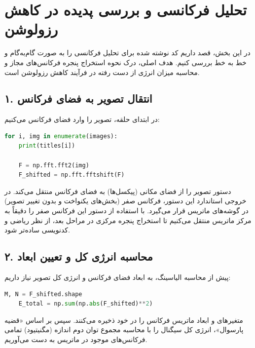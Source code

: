 \section{تحلیل فرکانسی و بررسی پدیده  در کاهش رزولوشن}

در این بخش، قصد داریم کد نوشته شده برای تحلیل فرکانسی را به صورت گام‌به‌گام و خط به خط بررسی کنیم. هدف اصلی، درک نحوه استخراج پنجره فرکانس‌های مجاز و محاسبه میزان انرژی از دست رفته در فرآیند کاهش رزولوشن است.

\subsection*{۱. انتقال تصویر به فضای فرکانس}
در ابتدای حلقه، تصویر را وارد فضای فرکانس می‌کنیم:

\begin{codebox}
\begin{lstlisting}[language=Python]
for i, img in enumerate(images):
    print(titles[i])
    
    F = np.fft.fft2(img)
    F_shifted = np.fft.fftshift(F)
\end{lstlisting}
\end{codebox}

دستور  تصویر را از فضای مکانی (پیکسل‌ها) به فضای فرکانس منتقل می‌کند. در خروجی استاندارد این دستور، فرکانس صفر (بخش‌های یکنواخت و بدون تغییر تصویر) در گوشه‌های ماتریس قرار می‌گیرد. با استفاده از دستور  این فرکانس صفر را دقیقاً به مرکز ماتریس منتقل می‌کنیم تا استخراج پنجره مرکزی در مراحل بعد، از نظر ریاضی و کدنویسی ساده‌تر شود.

\subsection*{۲. محاسبه انرژی کل و تعیین ابعاد}
پیش از محاسبه الیاسینگ، به ابعاد فضای فرکانس و انرژی کل تصویر نیاز داریم:

\begin{codebox}
\begin{lstlisting}[language=Python]
    M, N = F_shifted.shape
    E_total = np.sum(np.abs(F_shifted)**2)
\end{lstlisting}
\end{codebox}

متغیرهای  و  ابعاد ماتریس فرکانس را در خود ذخیره می‌کنند. سپس بر اساس «قضیه پارسوال»، انرژی کل سیگنال را با محاسبه مجموع توان دوم اندازه (مگنیتیود) تمامی فرکانس‌های موجود در ماتریس  به دست می‌آوریم.

